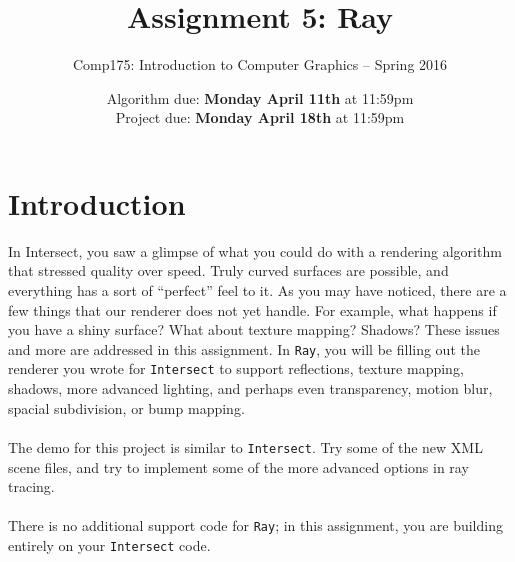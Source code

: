 \documentclass[10pt,twocolumn]{article}
\title{\Huge{\bf Assignment 5: Ray}}
\author{Comp175: Introduction to Computer Graphics -- Spring 2016}
\date{Algorithm due:  {\bf Monday April 11th} at 11:59pm\\
Project due:  {\bf Monday April 18th} at 11:59pm}                                           %
\begin{document}
\maketitle

\section{Introduction}								
In Intersect, you saw a glimpse of what you could do with a rendering algorithm that stressed quality over speed. Truly curved surfaces are possible, and everything has a sort of ``perfect'' feel to it. As you may have noticed, there are a few things that our renderer does not yet handle. For example, what happens if you have a shiny surface? What about texture mapping? Shadows? These issues and more are addressed in this assignment. In {\tt Ray}, you will be filling out the renderer you wrote for {\tt Intersect} to support reflections, texture mapping, shadows, more advanced lighting, and perhaps even transparency, motion blur, spacial subdivision, or bump mapping.\\\\The demo for this project is similar to {\tt Intersect}. Try some of the new XML scene files, and try to implement some of the more advanced options in ray tracing.\\\\There is no additional support code for {\tt Ray}; in this assignment, you are building entirely on your {\tt Intersect} code.
\end{document}
